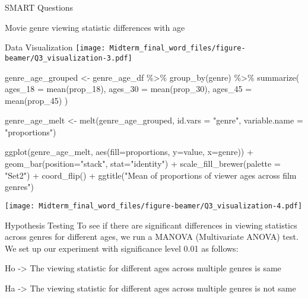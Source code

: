 \documentclass[
  ignorenonframetext,
]{beamer}
\newenvironment{Shaded}{\begin{snugshade}}{\end{snugshade}}
\newcommand{\AttributeTok}[1]{\textcolor[rgb]{0.77,0.63,0.00}{#1}}
\newcommand{\FunctionTok}[1]{\textcolor[rgb]{0.00,0.00,0.00}{#1}}
\newcommand{\NormalTok}[1]{#1}
\newcommand{\OtherTok}[1]{\textcolor[rgb]{0.56,0.35,0.01}{#1}}
\newcommand{\SpecialCharTok}[1]{\textcolor[rgb]{0.00,0.00,0.00}{#1}}
\newcommand{\StringTok}[1]{\textcolor[rgb]{0.31,0.60,0.02}{#1}}
\begin{document}
\begin{frame}[fragile]{SMART Questions}
\begin{block}{Movie genre viewing statistic differences with age}
\begin{block}{Data Visualization}
\texttt{[image: Midterm\_final\_word\_files/figure-beamer/Q3\_visualization-3.pdf]}

\begin{Shaded}
\begin{Highlighting}[]
\NormalTok{genre\_age\_grouped }\OtherTok{\textless{}{-}}\NormalTok{ genre\_age\_df }\SpecialCharTok{\%\textgreater{}\%}
  \FunctionTok{group\_by}\NormalTok{(genre) }\SpecialCharTok{\%\textgreater{}\%}
    \FunctionTok{summarize}\NormalTok{(}
      \AttributeTok{ages\_18 =} \FunctionTok{mean}\NormalTok{(prop\_18),}
      \AttributeTok{ages\_30 =} \FunctionTok{mean}\NormalTok{(prop\_30),}
      \AttributeTok{ages\_45 =} \FunctionTok{mean}\NormalTok{(prop\_45)}
\NormalTok{    )}

\NormalTok{genre\_age\_melt }\OtherTok{\textless{}{-}} \FunctionTok{melt}\NormalTok{(genre\_age\_grouped, }\AttributeTok{id.vars =} \StringTok{"genre"}\NormalTok{, }\AttributeTok{variable.name =} \StringTok{"proportions"}\NormalTok{)}

\FunctionTok{ggplot}\NormalTok{(genre\_age\_melt, }\FunctionTok{aes}\NormalTok{(}\AttributeTok{fill=}\NormalTok{proportions, }\AttributeTok{y=}\NormalTok{value, }\AttributeTok{x=}\NormalTok{genre)) }\SpecialCharTok{+} 
    \FunctionTok{geom\_bar}\NormalTok{(}\AttributeTok{position=}\StringTok{"stack"}\NormalTok{, }\AttributeTok{stat=}\StringTok{"identity"}\NormalTok{) }\SpecialCharTok{+}
        \FunctionTok{scale\_fill\_brewer}\NormalTok{(}\AttributeTok{palette =} \StringTok{"Set2"}\NormalTok{) }\SpecialCharTok{+}
            \FunctionTok{coord\_flip}\NormalTok{() }\SpecialCharTok{+} 
                \FunctionTok{ggtitle}\NormalTok{(}\StringTok{"Mean of proportions of viewer ages across film genres"}\NormalTok{)}
\end{Highlighting}
\end{Shaded}

\texttt{[image: Midterm\_final\_word\_files/figure-beamer/Q3\_visualization-4.pdf]}
\end{block}

\begin{block}{Hypothesis Testing}
\protect\hypertarget{hypothesis-testing}{}
To see if there are significant differences in viewing statistics across
genres for different ages, we run a MANOVA (Multivariate ANOVA) test. We
set up our experiment with significance level 0.01 as follows:

Ho -\textgreater{} The viewing statistic for different ages across
multiple genres is same

Ha -\textgreater{} The viewing statistic for different ages across
multiple genres is not same


\end{block}
\end{block}
\end{frame}
\end{document}
